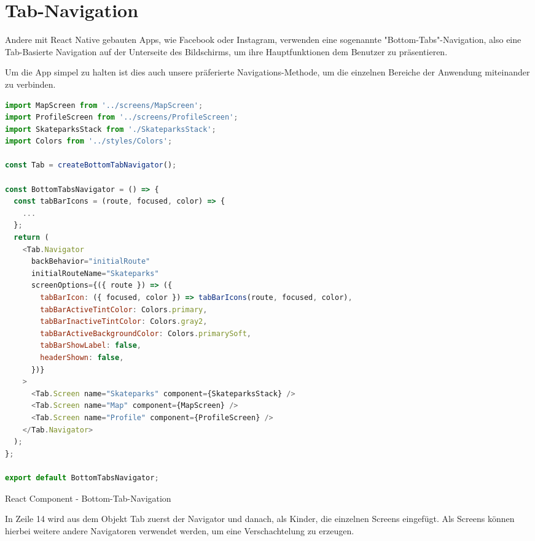 \section{Tab-Navigation}
Andere mit React Native gebauten Apps, wie Facebook oder Instagram, verwenden eine sogenannte
"Bottom-Tabs"{}-Navigation, also eine Tab-Basierte Navigation auf der Unterseite des Bildschirms, um
ihre Hauptfunktionen dem Benutzer zu präsentieren.

Um die App simpel zu halten ist dies auch unsere präferierte Navigations-Methode, um die einzelnen
Bereiche der Anwendung miteinander zu verbinden.

\begin{code}[htp]
\begin{lstlisting}[firstnumber=1,language=JavaScript, style=JSX]
import MapScreen from '../screens/MapScreen';
import ProfileScreen from '../screens/ProfileScreen';
import SkateparksStack from './SkateparksStack';
import Colors from '../styles/Colors';

const Tab = createBottomTabNavigator();

const BottomTabsNavigator = () => {
  const tabBarIcons = (route, focused, color) => {
    ...
  };
  return (
    <Tab.Navigator
      backBehavior="initialRoute"
      initialRouteName="Skateparks"
      screenOptions={({ route }) => ({
        tabBarIcon: ({ focused, color }) => tabBarIcons(route, focused, color),
        tabBarActiveTintColor: Colors.primary,
        tabBarInactiveTintColor: Colors.gray2,
        tabBarActiveBackgroundColor: Colors.primarySoft,
        tabBarShowLabel: false,
        headerShown: false,
      })}
    >
      <Tab.Screen name="Skateparks" component={SkateparksStack} />
      <Tab.Screen name="Map" component={MapScreen} />
      <Tab.Screen name="Profile" component={ProfileScreen} />
    </Tab.Navigator>
  );
};

export default BottomTabsNavigator;
\end{lstlisting}
\caption{React Component - Bottom-Tab-Navigation}
\end{code}

In Zeile 14 wird aus dem Objekt Tab zuerst der Navigator und danach, als Kinder, die einzelnen
Screens eingefügt. Als Screens können hierbei weitere andere Navigatoren verwendet werden, um eine
Verschachtelung zu erzeugen.

\newpage


\newpage
